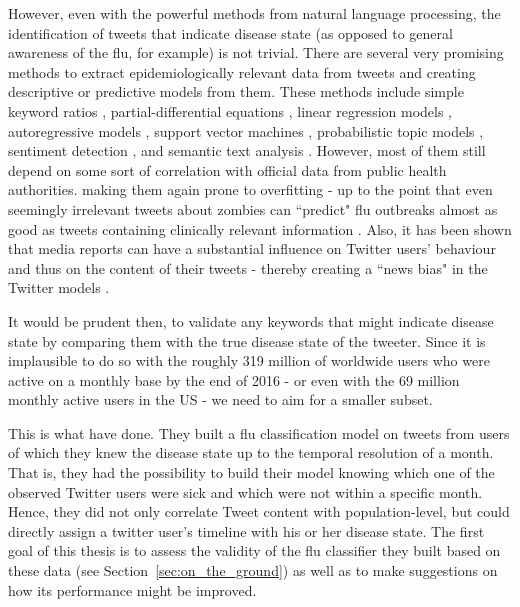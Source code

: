 \documentclass[11pt, a4paper,twoside]{report}\usepackage[]{graphicx}\usepackage[]{color}
\begin{document}
However, even with the powerful methods from natural language processing, the identification of tweets that indicate disease state (as opposed to general awareness of the flu, for example) is not trivial. There are several very promising methods to extract epidemiologically relevant data from tweets and creating descriptive or predictive models from them. These methods include simple keyword ratios \citep{lampos_tracking_2010}, partial-differential equations \citep{wang_regional_2016}, linear regression models \citep{culotta_towards_2010}, autoregressive models \citep{achrekar_predicting_2011,paul_twitter_2014,paul_worldwide_2015}, support vector machines \citep{paul_you_2011}, probabilistic topic models \citep{paul_you_2011}, sentiment detection \citep{aramaki_twitter_2011}, and semantic text analysis \citep{lamb_separating_2013}. However, most of them still depend on some sort of correlation with official data from public health authorities. making them again prone to overfitting - up to the point that even seemingly irrelevant tweets about zombies can ``predict" flu outbreaks almost as good as tweets containing clinically relevant information \citep{bodnar_validating_2013}. Also, it has been shown that media reports can have a substantial influence on Twitter users' behaviour and thus on the content of their tweets - thereby creating a ``news bias" in the Twitter models \citep{aramaki_twitter_2011}.

It would be prudent then, to validate any keywords that might indicate disease state by comparing them with the true disease state of the tweeter. Since it is implausible to do so with the roughly 319 million of worldwide users who were active on a monthly base by the end of 2016 - or even with the 69 million monthly active users in the US \citep{twitter_annual_2017} - we need to aim for a smaller subset.

This is what \cite{bodnar_ground_2014} have done. They built a flu classification model on tweets from users of which they knew the disease state up to the temporal resolution of a month. That is, they had the possibility to build their model knowing which one of the observed Twitter users were sick and which were not within a specific month. Hence, they did not only correlate Tweet content with population-level, but could directly assign a twitter user's timeline with his or her disease state. The first goal of this thesis is to assess the validity of the flu classifier they built based on these data (see Section~\ref{sec:on_the_ground}) as well as to make suggestions on how its performance might be improved.
\end{document}
